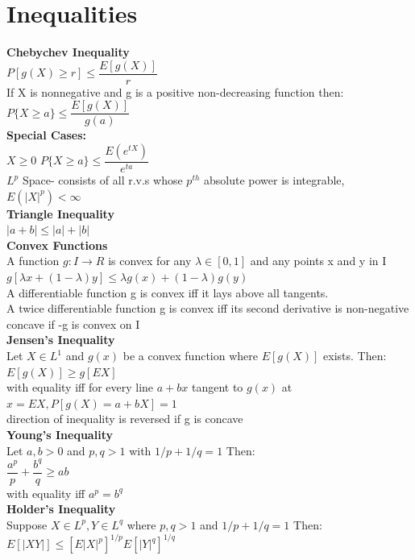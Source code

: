 \documentclass[openany]{book}
\begin{document}
\section{Inequalities}
\textbf{Chebychev Inequality}\\
$P[g(X)\geq r] \leq \dfrac{E[g(X)]}{r}$\\
If X is nonnegative and g is a positive non-decreasing function then:\\
$P\{X\geq a \}\leq \dfrac{E[g(X)]}{g(a)}$\\
\textbf{Special Cases:}\\
$X\geq 0$ \quad $P\{X\geq a \}\leq \dfrac{E(e^{tX})}{e^{ta}}$\\
$L^p$ Space- consists of all r.v.s whose $p^{th}$ absolute power is integrable, $E(|X|^p)<\infty$\\
\textbf{Triangle Inequality}\\
$|a+b|\leq |a|+|b|$\\
\textbf{Convex Functions}\\
A function $g: I\to R$ is convex for any $\lambda \in [0,1]$ and any points x and y in I\\
$g[\lambda x+(1-\lambda)y]\leq \lambda g(x)+(1-\lambda)g(y)$\\
A differentiable function g is convex iff it lays above all tangents.\\
A twice differentiable function g is convex iff its second derivative is non-negative\\
concave if -g is convex on I\\
\textbf{Jensen's Inequality}\\
Let $X \in L^1$ and $g(x)$ be a convex function where $E[g(X)]$ exists. Then:\\
$E[g(X)]\geq g[EX]$\\
with equality iff for every line $a+bx$ tangent to $g(x)$ at $x=EX, P[g(X)=a+bX]=1$\\
direction of inequality is reversed if g is concave\\
\textbf{Young's Inequality}\\
Let $a,b >0$ and $p,q>1$ with $1/p+1/q=1$ Then:\\
$\dfrac{a^p}{p}+\dfrac{b^q}{q}\geq ab$\\
with equality iff $a^p=b^q$\\
\textbf{Holder's Inequality}\\
Suppose $X \in L^p, Y \in L^q$ where $p,q>1$ and $1/p+1/q=1$ Then:\\
$E[|XY|]\leq [E|X|^p]^{1/p}E[|Y|^q]^{1/q}$\\
\end{document}
